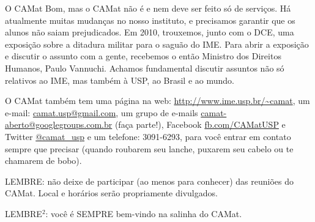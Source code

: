 \begin{secao}{O CAMat}
Bom, mas o CAMat não é e nem deve ser feito só de serviços. Há atualmente
muitas mudanças no nosso instituto, e precisamos garantir que os alunos não
saiam prejudicados. Em 2010, trouxemos, junto com o
DCE, uma exposição sobre a ditadura militar para o saguão do IME. Para abrir a
exposição e discutir o assunto com a gente, recebemos o então Ministro dos
Direitos Humanos, Paulo Vannuchi. Achamos fundamental discutir assuntos não só
relativos ao IME, mas também à USP, ao Brasil e ao mundo.


O CAMat também tem uma página na web: \url{http://www.ime.usp.br/~camat}, um
e-mail: \url{camat.usp@gmail.com}, um grupo de e-mails \url{camat-aberto@googlegroups.com.br} (faça parte!), Facebook \url{fb.com/CAMatUSP} e Twitter \url{@camat_usp} e um telefone: 3091-6293, para você entrar em contato sempre
que precisar (quando roubarem seu lanche, puxarem seu cabelo ou te chamarem de
bobo).

LEMBRE: não deixe de participar (ao menos para conhecer) das reuniões do
CAMat. Local e horários serão propriamente divulgados.

LEMBRE$^2$: você é SEMPRE bem-vindo na salinha do CAMat.

\end{secao}
